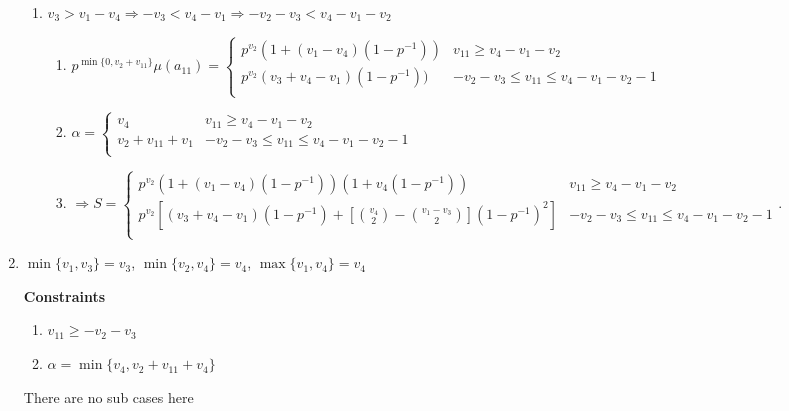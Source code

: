 \documentclass{article}
\begin{document}
\begin{enumerate}
\begin{enumerate}
        \item $v_3>{v_1-v_4}\Rightarrow{-v_3<{v_4-v_1}}\Rightarrow{-v_2-v_3<{v_4-v_1-v_2}}$

        \begin{enumerate}
            \item $p^{\min\{0,v_2+v_{11}\}}\mu(a_{11})=
            \left\{
	\begin{array}{ll}
            p^{v_2}(1+(v_1-v_4)(1-p^{-1})) & v_{11}\geq{v_4-v_1-v_2} \\
		  p^{v_2}(v_3+v_4-v_1)(1-p^{-1})) & -v_2-v_3\leq{v_{11}}\leq{v_4-v_1-v_2-1} \\
	\end{array}
\right.
$
            \item $\alpha=\left\{
	\begin{array}{ll}
            v_4  & v_{11}\geq{v_4-v_1-v_2} \\
		  v_2+v_{11}+v_1 & -v_2-v_3\leq{v_{11}}\leq{v_4-v_1-v_2-1} \\
	\end{array}
\right.$
        \item $\Rightarrow{S=\left\{
	\begin{array}{ll}
            p^{v_2}(1+(v_1-v_4)(1-p^{-1}))(1+v_4(1-p^{-1}))  & v_{11}\geq{v_4-v_1-v_2} \\
		              p^{v_2}[(v_3+v_4-v_1)(1-p^{-1})+[\binom{v_4}{2}-\binom{v_1-v_3}{2}](1-p^{-1})^2]  & -v_2-v_3\leq{v_{11}}\leq{v_4-v_1-v_2-1} \\
	\end{array}
\right.}.$
        \end{enumerate}

    \end{enumerate}

    \item $\min\{v_1,v_3\}=v_3$, $\min\{v_2,v_4\}=v_4$, $\max\{v_1,v_4\}=v_4$
    
    \textbf{Constraints}
    \begin{enumerate}
        \item $v_{11}\geq{-v_2-v_3}$
        \item $\alpha=\min\{v_4,v_2+v_{11}+v_4\}$
    \end{enumerate}
    There are no sub cases here 


\end{enumerate}
\end{document}
